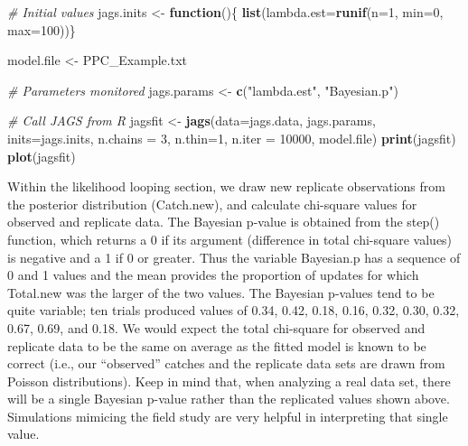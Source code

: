 \documentclass[
]{krantz}
\makeatletter
\newenvironment{Shaded}{\begin{snugshade}}{\end{snugshade}}
\newcommand{\AttributeTok}[1]{\textcolor[rgb]{0.27,0.27,0.27}{#1}}
\newcommand{\CommentTok}[1]{\textcolor[rgb]{0.37,0.37,0.37}{\textit{#1}}}
\newcommand{\ControlFlowTok}[1]{\textcolor[rgb]{0.27,0.27,0.27}{\textbf{#1}}}
\newcommand{\DecValTok}[1]{\textcolor[rgb]{0.06,0.06,0.06}{#1}}
\newcommand{\FunctionTok}[1]{\textcolor[rgb]{0.27,0.27,0.27}{\textbf{#1}}}
\newcommand{\NormalTok}[1]{#1}
\newcommand{\OtherTok}[1]{\textcolor[rgb]{0.37,0.37,0.37}{#1}}
\newcommand{\StringTok}[1]{\textcolor[rgb]{0.5,0.5,0.5}{#1}}
\newenvironment{kframe}{%
\medskip{}
\setlength{\fboxsep}{.8em}
 \def\at@end@of@kframe{}%
 \ifinner\ifhmode%
  \def\at@end@of@kframe{\end{minipage}}%
  \begin{minipage}{\columnwidth}%
 \fi\fi%
 \def\FrameCommand##1{\hskip\@totalleftmargin \hskip-\fboxsep
 \colorbox{shadecolor}{##1}\hskip-\fboxsep
     \hskip-\linewidth \hskip-\@totalleftmargin \hskip\columnwidth}%
 \MakeFramed {\advance\hsize-\width
   \@totalleftmargin\z@ \linewidth\hsize
   \@setminipage}}%
 {\par\unskip\endMakeFramed%
 \at@end@of@kframe}
\renewenvironment{Shaded}{\begin{kframe}}{\end{kframe}}
\makeatother
\begin{document}
\begin{Shaded}
\begin{Highlighting}[]
\CommentTok{\# Initial values}
\NormalTok{jags.inits }\OtherTok{\textless{}{-}} \ControlFlowTok{function}\NormalTok{()\{ }\FunctionTok{list}\NormalTok{(}\AttributeTok{lambda.est=}\FunctionTok{runif}\NormalTok{(}\AttributeTok{n=}\DecValTok{1}\NormalTok{, }\AttributeTok{min=}\DecValTok{0}\NormalTok{, }\AttributeTok{max=}\DecValTok{100}\NormalTok{))\}}

\NormalTok{model.file }\OtherTok{\textless{}{-}} \StringTok{\textquotesingle{}PPC\_Example.txt\textquotesingle{}}

\CommentTok{\# Parameters monitored}
\NormalTok{jags.params }\OtherTok{\textless{}{-}} \FunctionTok{c}\NormalTok{(}\StringTok{"lambda.est"}\NormalTok{, }\StringTok{"Bayesian.p"}\NormalTok{)}

\CommentTok{\# Call JAGS from R}
\NormalTok{jagsfit }\OtherTok{\textless{}{-}} \FunctionTok{jags}\NormalTok{(}\AttributeTok{data=}\NormalTok{jags.data, jags.params, }\AttributeTok{inits=}\NormalTok{jags.inits,}
                \AttributeTok{n.chains =} \DecValTok{3}\NormalTok{, }\AttributeTok{n.thin=}\DecValTok{1}\NormalTok{, }\AttributeTok{n.iter =} \DecValTok{10000}\NormalTok{,}
\NormalTok{                model.file)}
\FunctionTok{print}\NormalTok{(jagsfit)}
\FunctionTok{plot}\NormalTok{(jagsfit)}
\end{Highlighting}
\end{Shaded}

Within the likelihood looping section, we draw new replicate observations from the posterior distribution (Catch.new), and calculate chi-square values for observed and replicate data. The Bayesian p-value is obtained from the step() function, which returns a 0 if its argument (difference in total chi-square values) is negative and a 1 if 0 or greater. Thus the variable Bayesian.p has a sequence of 0 and 1 values and the mean provides the proportion of updates for which Total.new was the larger of the two values. The Bayesian p-values tend to be quite variable; ten trials produced values of 0.34, 0.42, 0.18, 0.16, 0.32, 0.30, 0.32, 0.67, 0.69, and 0.18. We would expect the total chi-square for observed and replicate data to be the same on average as the fitted model is known to be correct (i.e., our ``observed'' catches and the replicate data sets are drawn from Poisson distributions). Keep in mind that, when analyzing a real data set, there will be a single Bayesian p-value rather than the replicated values shown above. Simulations mimicing the field study are very helpful in interpreting that single value.
\end{document}
